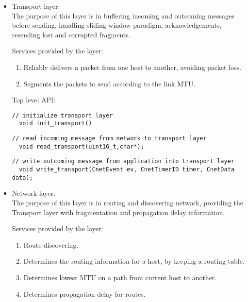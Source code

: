 \documentclass{article}
\begin{document}
\begin{itemize}		
\item	Transport layer: \\
		The purpose of this layer is in buffering incoming and outcoming
		 messages before sending, handling sliding window paradigm, 
		 acknowledgements, resending lost and corrupted fragments.
		
		Services provided by the layer:
    \begin{enumerate}
      \item Reliably delivers a packet from one host to another, avoiding
       packet loss.
      \item Segments the packets to send according to the link MTU.
    \end{enumerate}
		
		Top level API:
  
  \begin{lstlisting}
// initialize transport layer
  void init_transport()
\end{lstlisting}
    
		
		\begin{lstlisting}
// read incoming message from network to transport layer
  void read_transport(uint16_t,char*);
\end{lstlisting}
    
    
    \begin{lstlisting}
// write outcoming message from application into transport layer
  void write_transport(CnetEvent ev, CnetTimerID timer, CnetData data);
\end{lstlisting}
   
			
\item Network layer: \\
		The purpose of this layer is in routing and discovering network,
		 providing the Transport layer with fragmentation and propagation
		 delay information.
		
		Services provided by the layer:
    \begin{enumerate}
      \item Route discovering.
      \item Determines the routing information for a host, by keeping a routing
      table.
      \item Determines lowest MTU on a path from current host to another.
      \item Determines propagation delay for routes.
    \end{enumerate}
		

\end{itemize}
\end{document}
